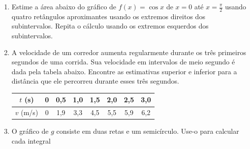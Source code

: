 \documentclass[a4paper,5pt]{amsbook}
\newcommand{\ds}{\displaystyle}
\begin{document}
\vspace{1cm}
\begin{enumerate}
    \vspace{0.5cm}
    \item Estime a \'area abaixo do gr\'afico de $f(x)=\cos{x}$ de $x=0$ at\'e
        $x=\ds\frac{\pi}{2}$ usando quatro ret\^angulos aproximantes usando os
        extremos direitos dos subintervalos. Repita o c\'alculo usando os
        extremos esquerdos dos subintervalos.

    \vspace{0.5cm}
    \item A velocidade de um corredor aumenta regularmente durante os tr\^es
        primeiros segundos de uma corrida. Sua velocidade em intervalos de
        meio segundo \'e dada pela tabela abaixo. Encontre as estimativas
        superior e inferior para a dist\^ancia que ele percorreu durante esses
        tr\^es segundos.

        \vspace{0.3cm}
        \begin{center}
        \begin{tabular}{|c|c|c|c|c|c|c|c|}
            \hline
            $t$ (s) & 0 & 0,5 & 1,0 & 1,5 & 2,0 & 2,5 & 3,0 \\
            \hline
            $v$ (m/s) & 0 & 1,9 & 3,3 & 4,5 & 5,5 & 5,9 & 6,2 \\
            \hline
        \end{tabular}
        \end{center}

    \vspace{0.5cm}
    \item O gr\'afico de $g$ consiste em duas retas e um semic\'{i}rculo. Use-o
        para calcular cada integral

    

\end{enumerate}
\end{document}
